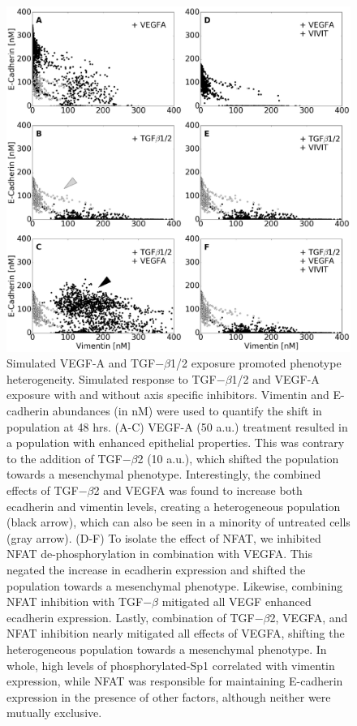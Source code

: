 \documentclass[12pt]{article}
\begin{document}
\begin{figure}
\includegraphics [width=1.0\linewidth] {./figs/Fig3_phenotype.pdf}
\caption{Simulated VEGF-A and TGF$-\beta$1/2 exposure promoted phenotype heterogeneity.
Simulated response to TGF$-\beta$1/2 and VEGF-A exposure with and without axis specific inhibitors.
Vimentin and E-cadherin abundances (in nM) were used to quantify the shift in population at 48 hrs.
(A-C) VEGF-A (50 a.u.) treatment resulted in a population with enhanced epithelial properties.
This was contrary to the addition of TGF$-\beta$2 (10 a.u.), which shifted the population towards a mesenchymal phenotype.
Interestingly, the combined effects of TGF$-\beta$2 and VEGFA was found to increase both ecadherin and vimentin levels, creating a heterogeneous population (black arrow), which can also be seen in a minority of untreated cells (gray arrow). (D-F) To isolate the effect of NFAT, we inhibited NFAT de-phosphorylation in combination with VEGFA. This negated the increase in ecadherin expression and shifted the population towards a mesenchymal phenotype.  Likewise, combining NFAT inhibition with TGF$-\beta$ mitigated all VEGF enhanced ecadherin expression.
Lastly, combination of TGF$-\beta$2, VEGFA, and NFAT inhibition nearly mitigated all effects of VEGFA, shifting the heterogeneous population towards a mesenchymal phenotype.
In whole, high levels of phosphorylated-Sp1 correlated with vimentin expression, while NFAT was responsible for maintaining E-cadherin expression in the presence of other factors, although neither were mutually exclusive.}
\label{fg:F3}
\end{figure}
\end{document}
